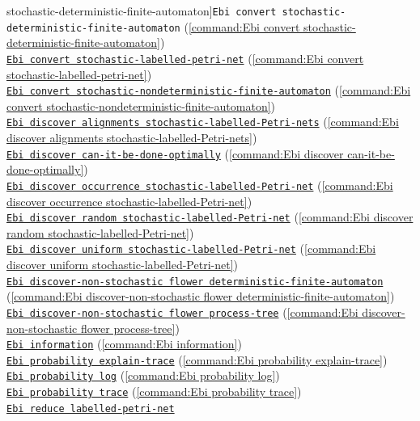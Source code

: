 {stochastic-deterministic-finite-automaton]{\texttt{Ebi convert stochastic-deterministic-finite-automaton}} (\cref{command:Ebi convert stochastic-deterministic-finite-automaton})\\\null\qquad\hyperref[command:Ebi convert stochastic-labelled-petri-net]{\texttt{Ebi convert stochastic-labelled-petri-net}} (\cref{command:Ebi convert stochastic-labelled-petri-net})\\\null\qquad\hyperref[command:Ebi convert stochastic-nondeterministic-finite-automaton]{\texttt{Ebi convert stochastic-nondeterministic-finite-automaton}} (\cref{command:Ebi convert stochastic-nondeterministic-finite-automaton})\\\null\qquad\hyperref[command:Ebi discover alignments stochastic-labelled-Petri-nets]{\texttt{Ebi discover alignments stochastic-labelled-Petri-nets}} (\cref{command:Ebi discover alignments stochastic-labelled-Petri-nets})\\\null\qquad\hyperref[command:Ebi discover can-it-be-done-optimally]{\texttt{Ebi discover can-it-be-done-optimally}} (\cref{command:Ebi discover can-it-be-done-optimally})\\\null\qquad\hyperref[command:Ebi discover occurrence stochastic-labelled-Petri-net]{\texttt{Ebi discover occurrence stochastic-labelled-Petri-net}} (\cref{command:Ebi discover occurrence stochastic-labelled-Petri-net})\\\null\qquad\hyperref[command:Ebi discover random stochastic-labelled-Petri-net]{\texttt{Ebi discover random stochastic-labelled-Petri-net}} (\cref{command:Ebi discover random stochastic-labelled-Petri-net})\\\null\qquad\hyperref[command:Ebi discover uniform stochastic-labelled-Petri-net]{\texttt{Ebi discover uniform stochastic-labelled-Petri-net}} (\cref{command:Ebi discover uniform stochastic-labelled-Petri-net})\\\null\qquad\hyperref[command:Ebi discover-non-stochastic flower deterministic-finite-automaton]{\texttt{Ebi discover-non-stochastic flower deterministic-finite-automaton}} (\cref{command:Ebi discover-non-stochastic flower deterministic-finite-automaton})\\\null\qquad\hyperref[command:Ebi discover-non-stochastic flower process-tree]{\texttt{Ebi discover-non-stochastic flower process-tree}} (\cref{command:Ebi discover-non-stochastic flower process-tree})\\\null\qquad\hyperref[command:Ebi information]{\texttt{Ebi information}} (\cref{command:Ebi information})\\\null\qquad\hyperref[command:Ebi probability explain-trace]{\texttt{Ebi probability explain-trace}} (\cref{command:Ebi probability explain-trace})\\\null\qquad\hyperref[command:Ebi probability log]{\texttt{Ebi probability log}} (\cref{command:Ebi probability log})\\\null\qquad\hyperref[command:Ebi probability trace]{\texttt{Ebi probability trace}} (\cref{command:Ebi probability trace})\\\null\qquad\hyperref[command:Ebi reduce labelled-petri-net]{\texttt{Ebi reduce labelled-petri-net}} }
